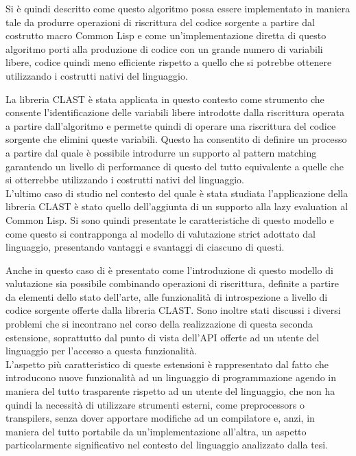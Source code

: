 \documentclass{book}
\begin{document}
Si è quindi descritto come questo algoritmo possa essere implementato in maniera
tale da produrre operazioni di riscrittura del codice sorgente a partire dal
costrutto macro Common Lisp e come un'implementazione diretta di questo
algoritmo porti alla produzione di codice con un grande numero di variabili
libere, codice quindi meno efficiente rispetto a quello che si potrebbe ottenere
utilizzando i costrutti nativi del linguaggio.

La libreria CLAST è stata applicata in questo contesto come strumento che
consente l'identificazione delle variabili libere introdotte dalla riscrittura
operata a partire dall'algoritmo e permette quindi di operare una riscrittura
del codice sorgente che elimini queste variabili. Questo ha consentito di
definire un processo a partire dal quale è possibile introdurre un supporto al
pattern matching garantendo un livello di performance di questo del tutto
equivalente a quelle che si otterrebbe utilizzando i costrutti nativi del
linguaggio.\\

L'ultimo caso di studio nel contesto del quale è stata studiata l'applicazione
della libreria CLAST è stato quello dell'aggiunta di un supporto alla lazy
evaluation al Common Lisp. Si sono quindi presentate le caratteristiche di
questo modello e come questo si contrapponga al modello di valutazione strict
adottato dal linguaggio, presentando vantaggi e svantaggi di ciascuno di questi.

Anche in questo caso di è presentato come l'introduzione di questo modello di
valutazione sia possibile combinando operazioni di riscrittura, definite a
partire da elementi dello stato dell'arte, alle funzionalità di introspezione a
livello di codice sorgente offerte dalla libreria CLAST. Sono inoltre stati
discussi i diversi problemi che si incontrano nel corso della realizzazione di
questa seconda estensione, soprattutto dal punto di vista dell'API offerte ad un
utente del linguaggio per l'accesso a questa funzionalità.\\

L'aspetto più caratteristico di queste estensioni è rappresentato dal fatto che
introducono nuove funzionalità ad un linguaggio di programmazione agendo in
maniera del tutto trasparente rispetto ad un utente del linguaggio, che non ha
quindi la necessità di utilizzare strumenti esterni, come preprocessors o
transpilers, senza dover apportare modifiche ad un compilatore e, anzi, in
maniera del tutto portabile da un'implementazione all'altra, un aspetto
particolarmente significativo nel contesto del linguaggio analizzato dalla tesi.
\end{document}
